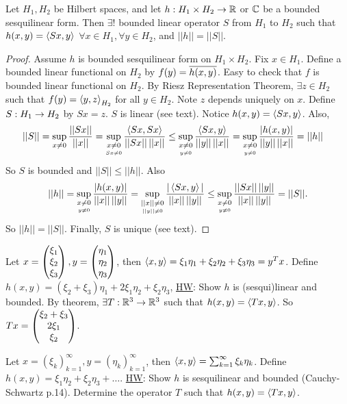 \documentclass[]{article}
\begin{document}
\begin{theorem}
	Let $H_1,H_2$ be Hilbert spaces, and let $h:H_1\times H_2\rightarrow\mathbb{R}$ or $\mathbb{C}$ be a bounded sesquilinear form.
	Then $\exists!$ bounded linear operator $S$ from $H_1$ to $H_2$ such that $h(x,y) = \left\langle Sx,y \right\rangle$ $\forall x\in H_1,\forall y\in H_2$, and $||h||=||S||$.
\end{theorem}
\begin{proof}
	Assume $h$ is bounded sesquilinear form on $H_1\times H_2$.
	Fix $x\in H_1$. Define a bounded linear functional on $H_2$ by $f(y)=\overline{h(x,y)}$.
	Easy to check that $f$ is bounded linear functional on $H_2$.
	By Riesz Representation Theorem, $\exists z\in H_2$ such that $f(y) = \left\langle y,z \right\rangle_{H_2}$ for all $y\in H_2$.
	Note $z$ depends uniquely on $x$.
	Define $S:H_1\rightarrow H_2$ by $Sx=z$. $S$ is linear (see text).
	Notice $h(x,y) = \left\langle Sx,y \right\rangle$.
	Also,
	\begin{align*}
		||S|| &= \sup_{x\neq0} \frac{||Sx||}{||x||} = \sup_{\underset{Sx\neq0}{x\neq0}} \frac{\left\langle Sx,Sx \right\rangle}{||Sx||\,||x||}
			  \leq \sup_{\underset{y\neq0}{x\neq0}} \frac{\left\langle Sx,y \right\rangle}{||y||\,||x||}
			  = \sup_{\underset{y\neq0}{x\neq0}} \frac{|h(x,y)|}{||y||\,||x||} = ||h||
	\end{align*}
	So $S$ is bounded and $||S||\leq||h||$.
	Also 
	\begin{align*}
		||h|| = \sup_{\underset{y\neq0}{x\neq0}} \frac{|h(x,y)|}{||x||\,||y||} = \sup_{\underset{||y||\neq0}{||x||\neq0}} \frac{|\left\langle Sx,y \right\rangle|}{||x||\,||y||}
		\leq \sup_{\underset{y\neq0}{x\neq0}} \frac{||Sx||\,||y||}{||x||\,||y||} = ||S||.
	\end{align*}
	So $||h||=||S||$. Finally, $S$ is unique (see text).
\end{proof}
\begin{example}
	[$H_1=H_2=\mb R^3$] 
	Let $x = \begin{pmatrix}\xi_1\\\xi_2\\\xi_3\end{pmatrix}, y = \begin{pmatrix}\eta_1\\\eta_2\\\eta_3\end{pmatrix}$, 
	then $\left\langle x,y \right\rangle = \xi_1\eta_1+\xi_2\eta_2+\xi_3\eta_3 = y^Tx$.
	Define $h(x,y) = (\xi_2+\xi_3)\eta_1+2\xi_1\eta_2+\xi_2\eta_3$, \ul{HW}: Show $h$ is (sesqui)linear and bounded.
	By theorem, $\exists T:\mathbb{R}^3\rightarrow\mathbb{R}^3$ such that $h(x,y) = \left\langle Tx,y \right\rangle$.
	So $Tx = \begin{pmatrix}\xi_2+\xi_3\\2\xi_1\\\xi_2\end{pmatrix}$.
\end{example}
\begin{example}
	[$H_1=H_2=\ell^2$]
	Let $x = (\xi_k)_{k=1}^\infty, y = (\eta_k)_{k=1}^\infty$, then $\left\langle x,y \right\rangle = \sum_{k=1}^\infty \xi_k\eta_k$.
	Define $h(x,y) = \xi_1\eta_2+\xi_2\eta_3+\dots$.
	\ul{HW}: Show $h$ is sesquilinear and bounded (Cauchy-Schwartz p.14).
	Determine the operator $T$ such that $h(x,y) = \left\langle Tx,y \right\rangle$.
\end{example}
\end{document}
